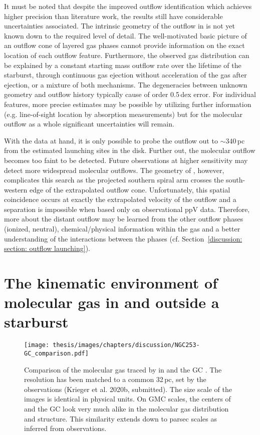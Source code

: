 It must be noted that despite the improved outflow identification which achieves higher precision than literature work, the results still have considerable uncertainties associated.
The intrinsic geometry of the outflow in  is not yet known down to the required level of detail. The well-motivated basic picture of an outflow cone of layered gas phases cannot provide information on the exact location of each outflow feature. 
Furthermore, the observed gas distribution can be explained by a constant starting mass outflow rate over the lifetime of the starburst, through continuous gas ejection without acceleration of the gas after ejection, or a mixture of both mechanisms.
The degeneracies between unknown geometry and outflow history typically cause of order 0.5\,dex error. For individual features, more precise estimates may be possible by utilizing further information (e.g. line-of-sight location by absorption measurements) but for the molecular outflow as a whole significant uncertainties will remain.

With the data at hand, it is only possible to probe the outflow out to $\sim 340$\,pc from the estimated launching sites in the disk. Further out, the molecular outflow becomes too faint to be detected. Future observations at higher sensitivity may detect more widespread molecular outflows. The geometry of , however, complicates this search as the projected southern spiral arm crosses the south-western edge of the extrapolated outflow cone. Unfortunately, this spatial coincidence occurs at exactly the extrapolated velocity of the outflow and a separation is impossible when based only on observational ppV data.
Therefore, more about the distant outflow may be learned from the other outflow phases (ionized, neutral), chemical/physical information within the gas and a better understanding of the interactions between the phases (cf. Section~\ref{discussion: section: outflow launching}).


\section{The kinematic environment of molecular gas in and outside a starburst}

\begin{figure}
    \centering
    \texttt{[image: thesis/images/chapters/discussion/NGC253-GC\_comparison.pdf]}
    \caption[Comparison of the  distribution in  and the GC]{Comparison of the molecular gas traced by  in  \citep{2013Natur.499..450B} and the GC \citep{2001ApJ...547..792D}. The resolution has been matched to a common 32\,pc, set by the  observations (Krieger et al. 2020b, submitted). The size scale of the images is identical in physical units. On GMC scales, the centers of  and the GC look very much alike in the molecular gas distribution and structure. This similarity extends down to parsec scales as inferred from  observations.
    }
    \label{discussion: figure: NGC253 GC comparison}
\end{figure}

